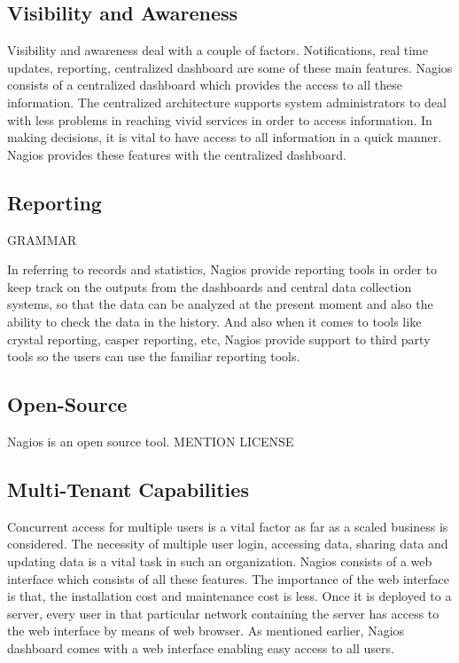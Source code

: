 \documentclass[9pt,twocolumn,twoside]{styles/osajnl}
\begin{document}
\subsection{Visibility and Awareness}

Visibility and awareness deal with a couple of factors. Notifications,
real time updates, reporting, centralized dashboard are some of these
main features. Nagios consists of a centralized dashboard which
provides the access to all these information. The centralized
architecture supports system administrators to deal with less problems
in reaching vivid services in order to access information. In making
decisions, it is vital to have access to all information in a quick
manner.  Nagios provides these features with the centralized
dashboard.

\subsection{Reporting}

GRAMMAR

In referring to records and statistics, Nagios provide reporting tools
in order to keep track on the outputs from the dashboards and central
data collection systems, so that the data can be analyzed at the
present moment and also the ability to check the data in the history.
And also when it comes to tools like crystal reporting, casper
reporting, etc, Nagios provide support to third party tools so the
users can use the familiar reporting tools.

\subsection{Open-Source}

Nagios is an open source tool. MENTION LICENSE

\subsection{Multi-Tenant Capabilities}

Concurrent access for multiple users is a vital factor as far as
a scaled business is considered. The necessity of multiple user login,
accessing data, sharing data and updating data is a vital task in such
an organization. Nagios consists of a web interface which consists of
all these features. The importance of the web interface is that,
the installation cost and maintenance cost is less. Once it is deployed
to a server, every user in that particular network containing the server
has access to the web interface by means of web browser. As mentioned earlier,
Nagios dashboard comes with a web interface enabling easy access to all users.
\end{document}
